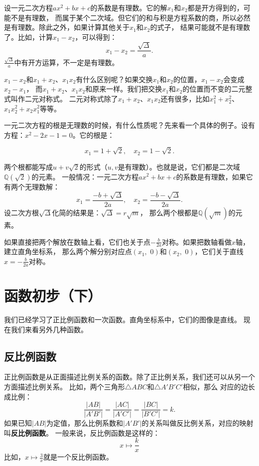 \documentclass[12pt,UTF8]{ctexbook}
\begin{document}
设一元二次方程$ax^2 + bx + c$的系数是有理数。它的解$x_1$和$x_2$都是开方得到的，可能不是有理数，
而属于某个二次域。但它们的和与积是方程系数的商，所以必然是有理数。除此之外，如果计算其他关于$x_1$和$x_2$的式子，
结果可能就不是有理数了。比如，计算$x_1 - x_2$，可以得到：
$$ x_1 - x_2 = \frac{\sqrt{\Delta}}{a}. $$
$\frac{\sqrt{\Delta}}{a}$中有开方运算，不一定是有理数。

$x_1 - x_2$和$x_1 + x_2$、$x_1x_2$有什么区别呢？如果交换$x_1$和$x_2$的位置，$x_1 - x_2$会变成$x_2 - x_1$，
而$x_1 + x_2$、$x_1x_2$和原来一样。我们把交换$x_1$和$x_2$的位置而不变的二元整式叫作二元对称式。
二元对称式除了$x_1 + x_2$、$x_1x_2$还有很多，比如$x_1^2 + x_2^2$、$x_1x_2^2 + x_2x_1^2$等等。

一元二次方程的根是无理数的时候，有什么性质呢？先来看一个具体的例子。设有方程：$x^2 - 2x - 1 = 0$。它的根是：

$$ x_1 = 1 + \sqrt{2}, \quad x_2 = 1 - \sqrt{2}.$$

两个根都能写成$u + v\sqrt{2}$的形式（$u,v$是有理数）。也就是说，它们都是二次域$\mathbb{Q}(\sqrt{2})$的元素。
一般情况：一元二次方程$ax^2 + bx + c$的系数是有理数，如果它有两个无理数解：
$$x_{1} = \frac{-b + \sqrt{\Delta}}{2a},\quad x_{2} = \frac{-b - \sqrt{\Delta}}{2a}.$$
设二次方根$\sqrt{\Delta}$化简的结果是：$\sqrt{\Delta} = r\sqrt{m}$，
那么两个根都是$\mathbb{Q}(\sqrt{m})$的元素。

如果直接把两个解放在数轴上看，它们也关于点$-\frac{b}{2a}$对称。如果把数轴看做$x$轴，建立直角坐标系，
那么两个解分别对应点$(x_1, \,\,0)$和$(x_2, \,\,0)$，它们关于直线$x = -\frac{b}{2a}$对称。

\chapter{函数初步（下）}
我们已经学习了正比例函数和一次函数。直角坐标系中，它们的图像是直线。
现在我们来看另外几种函数。

\section{反比例函数}
正比例函数是从正面描述比例关系的函数。除了正比例关系，我们还可以从另一个方面描述比例关系。
比如，两个三角形$\triangle ABC$和$\triangle A'B'C'$相似，那么
对应的边长成比例：
$$ \frac{|AB|}{|A'B'|} = \frac{|AC|}{|A'C'|} = \frac{|BC|}{|B'C'|} = k.$$
如果已知$|AB|$为定值，那么比例系数和$|A'B'|$的关系叫做反比例关系，对应的映射叫\textbf{反比例函数}。
一般来说，反比例函数是这样的：
$$ x \mapsto \frac{k}{x}$$
比如，$x \mapsto \frac{3}{x}$就是一个反比例函数。
\end{document}
